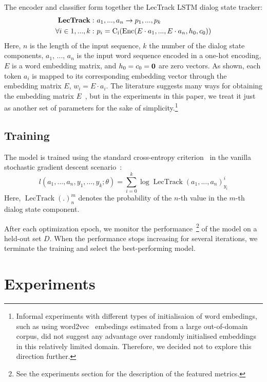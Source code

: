 \documentclass[10pt,twocolumn]{article}
\begin{document}
The encoder and classifier form together the LecTrack LSTM dialog state tracker:
\begin{align*}
\bf{LecTrack}: & ~a_1, ..., a_n \rightarrow p_{1}, ..., p_{k} \\
\forall i \in {1, ..., k}: & ~p_i = \operatorname{C_i}(\operatorname{Enc}(E \cdot a_1, ..., E \cdot a_n, h_0, c_0))
\end{align*}
Here, $n$ is the length of the input sequence, $k$ the number of the dialog state components, $a_1$, ..., $a_n$ is the input word sequence encoded in a one-hot encoding, $E$ is a word embedding matrix, and $h_0=c_0=\bf{0}$ are zero vectors. As shown, each token $a_i$ is mapped to its corresponding embedding vector through the embedding matrix $E$, $w_i=E\cdot a_i$. The literature suggests many ways for obtaining the embedding matrix $E$~\cite{mikolov2013efficient,kim2014convolutional,stratosspectral}, but in the experiments in this paper, we treat it just as another set of parameters for the sake of simplicity.\footnote{Informal experiments with different types of initialisaion of word embedings, such as using word2vec~\cite{mikolov2013efficient} embedings estimated from a large out-of-domain corpus, did not suggest any advantage over randomly initialised embeddings in this relatively limited domain. Therefore, we decided not to explore this direction further.}

\subsection{Training}
The model is trained using the standard cross-entropy criterion~\cite{rubinstein2004cross} in the vanilla stochastic gradient descent scenario~\cite{bottou2010large}:
$$ l(a_1, ..., a_n, y_1, ..., y_k; \theta) = \sum_{i=0}^k \operatorname{log} \operatorname{LecTrack}(a_1, ..., a_n)^i_{y_i}$$
Here, $\operatorname{LecTrack}(.)^m_n$ denotes the probability of the $n$-th value in the $m$-th dialog state component.

After each optimization epoch, we monitor the performance~\footnote{See the experiments section for the description of the featured metrics.} of the model on a held-out set $D$. When the performance stops increasing for several iterations, we terminate the training and select the best-performing model.


\section{Experiments}
\label{sec:experiments}
\end{document}

